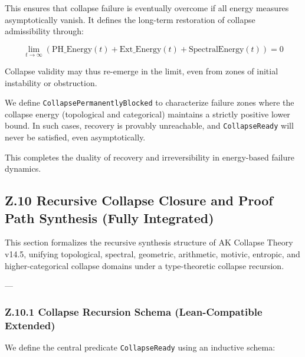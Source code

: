 \documentclass[11pt]{article}
\begin{document}
This ensures that collapse failure is eventually overcome if all energy measures asymptotically vanish.  
It defines the long-term restoration of collapse admissibility through:

\[
\lim_{t \to \infty} (\mathrm{PH\_Energy}(t) + \mathrm{Ext\_Energy}(t) + \mathrm{SpectralEnergy}(t)) = 0
\]

Collapse validity may thus re-emerge in the limit, even from zones of initial instability or obstruction.

We define \texttt{CollapsePermanentlyBlocked} to characterize failure zones 
where the collapse energy (topological and categorical) maintains a strictly positive lower bound. 
In such cases, recovery is provably unreachable, and \texttt{CollapseReady} will never be satisfied, 
even asymptotically.

This completes the duality of recovery and irreversibility in energy-based failure dynamics.



\subsection*{Z.10 Recursive Collapse Closure and Proof Path Synthesis (Fully Integrated)}

This section formalizes the recursive synthesis structure of AK Collapse Theory v14.5, unifying topological, spectral, geometric, arithmetic, motivic, entropic, and higher-categorical collapse domains under a type-theoretic collapse recursion.

---

\subsubsection*{Z.10.1 Collapse Recursion Schema (Lean-Compatible Extended)}

We define the central predicate \texttt{CollapseReady} using an inductive schema:
\end{document}
